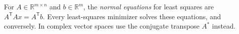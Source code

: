 
For $A\in\mathbb R^{m\times n}$ and $b\in\mathbb R^m$, the \emph{normal equations} for least squares are $A^{\mathsf T}Ax=A^{\mathsf T}b$. Every least-squares minimizer solves these equations, and conversely. In complex vector spaces use the conjugate transpose $A^*$ instead.
